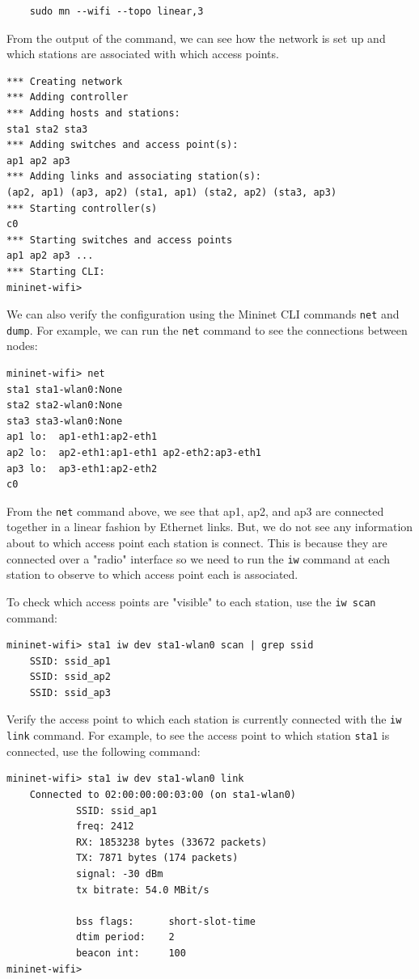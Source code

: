 \begin{verbatim}
    sudo mn --wifi --topo linear,3
\end{verbatim}
    
From the output of the command, we can see how the network is set up and which stations are associated with which access points.

\begin{verbatim}
*** Creating network
*** Adding controller
*** Adding hosts and stations:
sta1 sta2 sta3
*** Adding switches and access point(s):
ap1 ap2 ap3
*** Adding links and associating station(s):
(ap2, ap1) (ap3, ap2) (sta1, ap1) (sta2, ap2) (sta3, ap3)
*** Starting controller(s)
c0
*** Starting switches and access points
ap1 ap2 ap3 ...
*** Starting CLI:
mininet-wifi>
\end{verbatim}
    
We can also verify the configuration using the Mininet CLI commands \texttt{net} and \texttt{dump}. For example, we can run the \texttt{net} command to see the connections between nodes:

\begin{verbatim}
mininet-wifi> net
sta1 sta1-wlan0:None
sta2 sta2-wlan0:None
sta3 sta3-wlan0:None
ap1 lo:  ap1-eth1:ap2-eth1
ap2 lo:  ap2-eth1:ap1-eth1 ap2-eth2:ap3-eth1
ap3 lo:  ap3-eth1:ap2-eth2
c0
\end{verbatim}
    
From the \texttt{net} command above, we see that ap1, ap2, and ap3 are connected together in a linear fashion by Ethernet links. But, we do not see any information about to which access point each station is connect. This is because they are connected over a "radio" interface so we need to run the \texttt{iw} command at each station to observe to which access point each is associated.

To check which access points are "visible" to each station, use the \texttt{iw scan} command:

\begin{verbatim}
mininet-wifi> sta1 iw dev sta1-wlan0 scan | grep ssid
    SSID: ssid_ap1
    SSID: ssid_ap2
    SSID: ssid_ap3
\end{verbatim}

Verify the access point to which each station is currently connected with the \texttt{iw link} command. For example, to see the access point to which station \texttt{sta1} is connected, use the following command:

\begin{verbatim}
mininet-wifi> sta1 iw dev sta1-wlan0 link
    Connected to 02:00:00:00:03:00 (on sta1-wlan0)
            SSID: ssid_ap1
            freq: 2412
            RX: 1853238 bytes (33672 packets)
            TX: 7871 bytes (174 packets)
            signal: -30 dBm
            tx bitrate: 54.0 MBit/s
           
            bss flags:      short-slot-time
            dtim period:    2
            beacon int:     100
mininet-wifi>
\end{verbatim}
    

